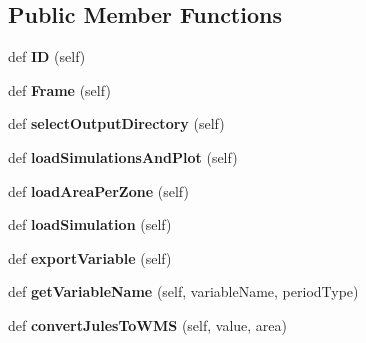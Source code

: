 \subsection*{Public Member Functions}
\begin{DoxyCompactItemize}
\item 
\mbox{\label{class_f_plots_1_1_frm_plots_adb8818239148d2e5c5833a2b062ee9ad}} 
def {\bfseries ID} (self)
\item 
\mbox{\label{class_f_plots_1_1_frm_plots_acf44064249ee17c3e8952b4c33512f86}} 
def {\bfseries Frame} (self)
\item 
\mbox{\label{class_f_plots_1_1_frm_plots_a3af7bd47020a22de652781d72c19a265}} 
def {\bfseries select\+Output\+Directory} (self)
\item 
\mbox{\label{class_f_plots_1_1_frm_plots_acf90b44776d8669c402087788d5246fb}} 
def {\bfseries load\+Simulations\+And\+Plot} (self)
\item 
\mbox{\label{class_f_plots_1_1_frm_plots_a27780f47ca6f6a3b9b6c8b2475eec865}} 
def {\bfseries load\+Area\+Per\+Zone} (self)
\item 
\mbox{\label{class_f_plots_1_1_frm_plots_a95c298b0291c27af5d40f1a40dca8f0b}} 
def {\bfseries load\+Simulation} (self)
\item 
\mbox{\label{class_f_plots_1_1_frm_plots_a9bdc9f98fcbe640957caca266a3e0f0a}} 
def {\bfseries export\+Variable} (self)
\item 
\mbox{\label{class_f_plots_1_1_frm_plots_a834376d8212664e7208c644d0a36f1c8}} 
def {\bfseries get\+Variable\+Name} (self, variable\+Name, period\+Type)
\item 
\mbox{\label{class_f_plots_1_1_frm_plots_acf73ddfd8b8ce73ddeb8a362b41a55ec}} 
def {\bfseries convert\+Jules\+To\+W\+MS} (self, value, area)
\item 
\mbox{\label{class_f_plots_1_1_frm_plots_af7683488b51773e23270b5cdd3380c8c}} 

\end{DoxyCompactItemize}
